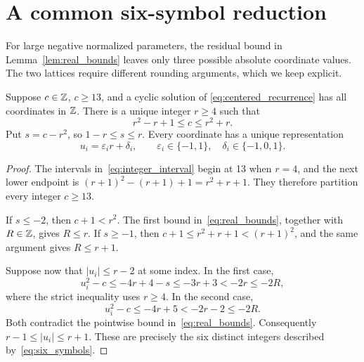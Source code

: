 \section{A common six-symbol reduction}
\label{sec:six_symbols}

For large negative normalized parameters, the residual bound in
Lemma~\ref{lem:real_bounds} leaves only three possible absolute
coordinate values. The two lattices require different rounding
arguments, which we keep explicit.

\begin{lemma}
\label{lem:integer_center}
Suppose \(c\in\mathbb{Z}\), \(c\ge13\), and a cyclic solution of
\eqref{eq:centered_recurrence} has all coordinates in \(\mathbb{Z}\).
There is a unique integer \(r\ge4\) such that
\begin{equation}
 r^2-r+1\le c\le r^2+r.
 \label{eq:integer_interval}
\end{equation}
Put \(s=c-r^2\), so \(1-r\le s\le r\). Every coordinate has a unique
representation
\begin{equation}
 u_i=\varepsilon_i r+\delta_i,
 \qquad \varepsilon_i\in\{-1,1\},\quad
 \delta_i\in\{-1,0,1\}.
 \label{eq:six_symbols}
\end{equation}
\end{lemma}
\begin{proof}
The intervals in~\eqref{eq:integer_interval} begin at 13 when \(r=4\),
and the next lower endpoint is
\((r+1)^2-(r+1)+1=r^2+r+1\). They therefore partition every integer
\(c\ge13\).

If \(s\le-2\), then \(c+1<r^2\). The first bound
in~\eqref{eq:real_bounds}, together with \(R\in\mathbb{Z}\), gives \(R\le r\).
If \(s\ge-1\), then
\(c+1\le r^2+r+1<(r+1)^2\), and the same argument gives
\(R\le r+1\).

Suppose now that \(|u_i|\le r-2\) at some index. In the first case,
\[
 u_i^2-c\le-4r+4-s\le-3r+3<-2r\le-2R,
\]
where the strict inequality uses \(r\ge4\). In the second case,
\[
 u_i^2-c\le-4r+5<-2r-2\le-2R.
\]
Both contradict the pointwise bound in~\eqref{eq:real_bounds}.
Consequently \(r-1\le|u_i|\le r+1\). These are precisely the six
distinct integers described by~\eqref{eq:six_symbols}.
\end{proof}


